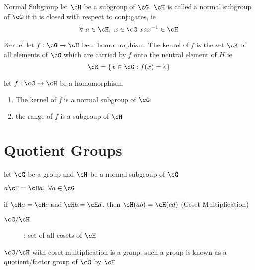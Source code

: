 \documentclass[11pt, oneside, dvipdfmx]{book}
\begin{document}
\begin{MyDefinition}{Normal Subgroup}
let $\cH$ be a subgroup of $\cG$. $\cH$ is called a normal subgroup of $\cG$ if it is closed with respect to conjugates, ie $$ \forall ~a\in \cH, ~x\in \cG~ xax^{-1} \in \cH$$
\end{MyDefinition}

\begin{MyDefinition}{Kernel}
let $f:\cG \rightarrow \cH$ be a homomorphism. The kernel of $f$ is the set $\cK$ of all elements of $\cG$ which are carried by $f$ onto the neutral element of $H$ ie 
$$ \cK = \{x\in \cG : f(x) = e  \}$$
\end{MyDefinition}

\begin{MyTheorem}
let $f:\cG \rightarrow \cH$ be a homomorphism. 
\begin{enumerate}
\item The kernel of $f$ is a normal subgroup of $\cG$

\item the range of $f$ is a subgroup of $\cH$
\end{enumerate}
\end{MyTheorem}

\section{Quotient Groups}
\begin{description}
\item let $\cG$ be a group and $\cH$ be a normal subgroup of $\cG$
\item 
\end{description}

\begin{MyTheorem}
$a\cH = \cH a ,~ \forall a \in \cG$
\end{MyTheorem}

\begin{MyTheorem}
if $\cH a= \cH c ~\text{and}~ \cH b = \cH d$. then  $\cH(ab) = \cH(cd)$ (Coset Multiplication)
\end{MyTheorem}

\begin{description}
\item[$\cG / \cH$] : set of all cosets of $\cH$
\end{description}

\begin{MyTheorem}
$\cG / \cH$ with coset multiplication is a group. such a group is known as a quotient/factor group of $\cG$ by $\cH$
\end{MyTheorem}
\end{document}
